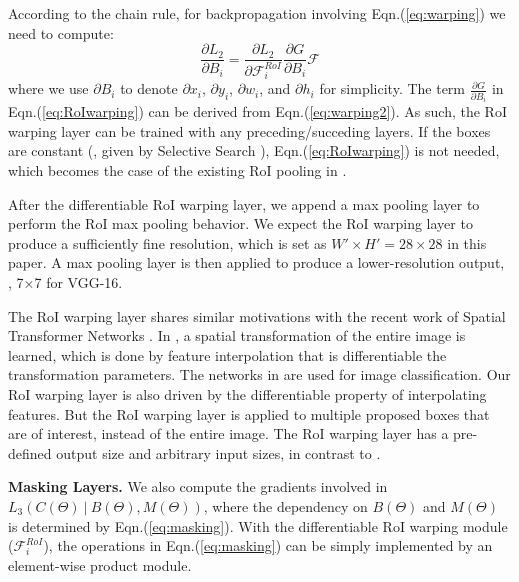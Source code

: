 \documentclass[10pt,twocolumn,letterpaper]{article}
\begin{document}
According to the chain rule, for backpropagation involving Eqn.(\ref{eq:warping}) we need to compute:
\begin{equation}
\frac{\partial{L_2}}{\partial{B_i}} = %
\frac{\partial{L_2}}{\partial{\mathcal{F}^{RoI}_i}} \frac{\partial{G}}{\partial{B_i}}\mathcal{F}
\label{eq:RoIwarping}
\end{equation}
where we use ${\partial{B_i}}$ to denote ${\partial{x_i}}$, ${\partial{y_i}}$, ${\partial{w_i}}$, and ${\partial{h_i}}$ for simplicity. The term $\frac{\partial{G}}{\partial{B_i}}$ in Eqn.(\ref{eq:RoIwarping}) can be derived from Eqn.(\ref{eq:warping2}). As such, the RoI warping layer can be trained with any preceding/succeding layers. If the boxes are constant (\eg, given by Selective Search \cite{Uijlings2013}), Eqn.(\ref{eq:RoIwarping}) is not needed, which becomes the case of the existing RoI pooling in \cite{Girshick2015}.

After the differentiable RoI warping layer, we append a max pooling layer to perform the RoI max pooling behavior. We expect the RoI warping layer to produce a sufficiently fine resolution, which is set as $W'\times H'=28\times28$ in this paper. A max pooling layer is then applied to produce a lower-resolution output, \eg, 7$\times$7 for VGG-16.

The RoI warping layer shares similar motivations with the recent work of Spatial Transformer Networks \cite{Jaderberg2015}. In \cite{Jaderberg2015}, a spatial transformation of the entire image is learned, which is done by feature interpolation that is differentiable \wrt the transformation parameters. The networks in \cite{Jaderberg2015} are used for image classification. Our RoI warping layer is also driven by the differentiable property of interpolating features.
But the RoI warping layer is applied to multiple proposed boxes that are of interest, instead of the entire image. The RoI warping layer has a pre-defined output size and arbitrary input sizes, in contrast to \cite{Jaderberg2015}.


\vspace{.5em}
\noindent\textbf{Masking Layers.}
We also compute the gradients involved in $L_3(C(\Theta)~|~B(\Theta), M(\Theta))$, where the dependency on $B(\Theta)$ and $M(\Theta)$ is determined by Eqn.(\ref{eq:masking}).
With the differentiable RoI warping module ($\mathcal{F}^{RoI}_i$), the operations in Eqn.(\ref{eq:masking}) can be simply implemented by an element-wise product module.
\end{document}

